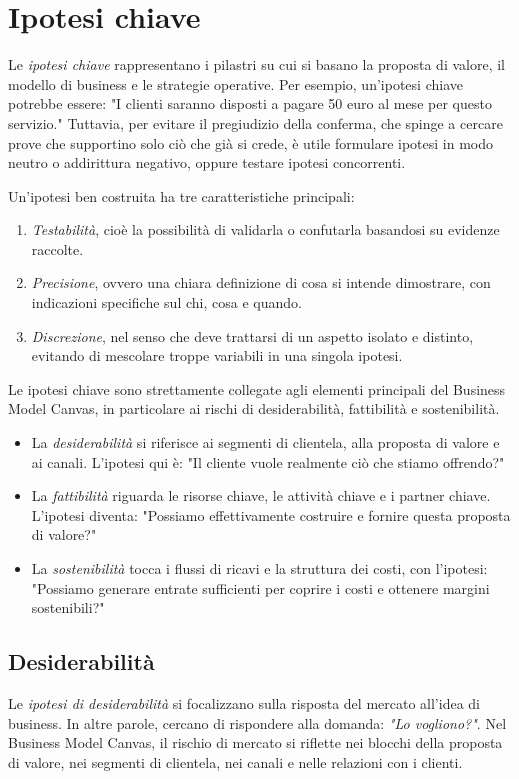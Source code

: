 \section{Ipotesi chiave}
Le \textit{ipotesi chiave} rappresentano i pilastri su cui si basano la proposta di valore, il modello di business e le strategie operative. Per esempio, un’ipotesi chiave potrebbe essere: "I clienti saranno disposti a pagare 50 euro al mese per questo servizio." Tuttavia, per evitare il pregiudizio della conferma, che spinge a cercare prove che supportino solo ciò che già si crede, è utile formulare ipotesi in modo neutro o addirittura negativo, oppure testare ipotesi concorrenti.

Un’ipotesi ben costruita ha tre caratteristiche principali:
\begin{enumerate}
    \item \textit{Testabilità}, cioè la possibilità di validarla o confutarla basandosi su evidenze raccolte.
    \item \textit{Precisione}, ovvero una chiara definizione di cosa si intende dimostrare, con indicazioni specifiche sul chi, cosa e quando.
    \item \textit{Discrezione}, nel senso che deve trattarsi di un aspetto isolato e distinto, evitando di mescolare troppe variabili in una singola ipotesi.
\end{enumerate}
Le ipotesi chiave sono strettamente collegate agli elementi principali del Business Model Canvas, in particolare ai rischi di desiderabilità, fattibilità e sostenibilità.
\begin{itemize}
    \item La \textit{desiderabilità} si riferisce ai segmenti di clientela, alla proposta di valore e ai canali. L’ipotesi qui è: "Il cliente vuole realmente ciò che stiamo offrendo?"
    \item La \textit{fattibilità} riguarda le risorse chiave, le attività chiave e i partner chiave. L’ipotesi diventa: "Possiamo effettivamente costruire e fornire questa proposta di valore?"
    \item La \textit{sostenibilità} tocca i flussi di ricavi e la struttura dei costi, con l’ipotesi: "Possiamo generare entrate sufficienti per coprire i costi e ottenere margini sostenibili?"
\end{itemize}

\subsection{Desiderabilità}
Le \textit{ipotesi di desiderabilità} si focalizzano sulla risposta del mercato all’idea di business. In altre parole, cercano di rispondere alla domanda: \textit{"Lo vogliono?"}. Nel Business Model Canvas, il rischio di mercato si riflette nei blocchi della proposta di valore, nei segmenti di clientela, nei canali e nelle relazioni con i clienti.

